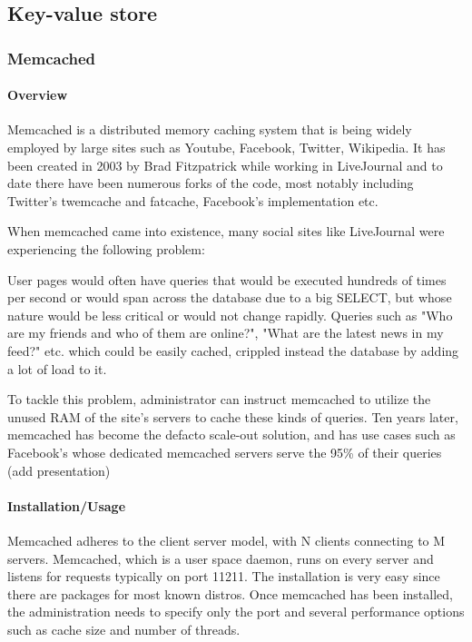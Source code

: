\subsection{Key-value store}

\subsubsection{Memcached}

\paragraph{Overview}

Memcached is a distributed memory caching system that is being widely employed 
by large sites such as Youtube, Facebook, Twitter, Wikipedia. It has been 
created in 2003 by Brad Fitzpatrick while working in LiveJournal and to date 
there have been numerous forks of the code, most notably including Twitter's 
twemcache and fatcache, Facebook's implementation etc.

When memcached came into existence, many social sites like LiveJournal were 
experiencing the following problem:

User pages would often have queries that would be executed hundreds of times 
per second or would span across the database due to a big SELECT, but whose 
nature would be less critical or would not change rapidly. Queries such as "Who 
are my friends and who of them are online?", "What are the latest news in my 
feed?" etc. which could be easily cached, crippled instead the database by 
adding a lot of load to it.

To tackle this problem, administrator can instruct memcached to utilize the 
unused RAM of the site's servers to cache these kinds of queries. Ten years 
later, memcached has become the defacto scale-out solution, and has use cases 
such as Facebook's whose dedicated memcached servers serve the 95\% of their 
queries (\fixme add presentation)

\paragraph{Installation/Usage}

Memcached adheres to the client server model, with N clients connecting to M 
servers. Memcached, which is a user space daemon, runs on every server and
listens for requests typically on port 11211. The installation is very easy 
since there are packages for most known distros. Once memcached has been 
installed, the administration needs to specify only the port and several 
performance options such as cache size and number of threads.


